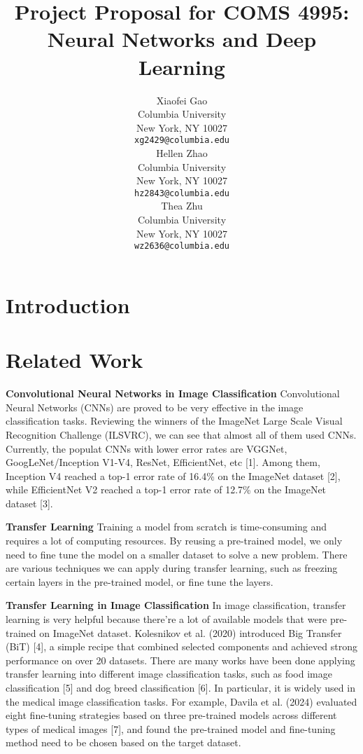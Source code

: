 \documentclass{article}
\title{Project Proposal for COMS 4995:  Neural Networks and Deep Learning}
\author{
  Xiaofei Gao \\
  Columbia University\\
  New York, NY 10027 \\
  \texttt{xg2429@columbia.edu} \\
  \And
  Hellen Zhao \\
  Columbia University\\
  New York, NY 10027 \\
  \texttt{hz2843@columbia.edu} \\
  \AND
  Thea Zhu \\
  Columbia University\\
  New York, NY 10027 \\
  \texttt{wz2636@columbia.edu} \\
}
\begin{document}
\maketitle


\begin{abstract}

\end{abstract}

\section{Introduction}

\section{Related Work}

\textbf{Convolutional Neural Networks in Image Classification} Convolutional Neural Networks (CNNs) are proved to be very effective 
in the image classification tasks. Reviewing the winners of the ImageNet Large Scale Visual Recognition Challenge (ILSVRC), we 
can see that almost all of them used CNNs. Currently, the populat CNNs with lower error rates are VGGNet, GoogLeNet/Inception V1-V4, 
ResNet, EfficientNet, etc [1]. Among them, Inception V4 reached a top-1 error rate of 16.4\% on the ImageNet dataset [2], while 
EfficientNet V2 reached a top-1 error rate of 12.7\% on the ImageNet dataset [3].

\textbf{Transfer Learning} Training a model from scratch is time-consuming and requires a lot of computing resources. By reusing 
a pre-trained model, we only need to fine tune the model on a smaller dataset to solve a new problem. There are various techniques 
we can apply during transfer learning, such as freezing certain layers in the pre-trained model, or fine tune the layers.

\textbf{Transfer Learning in Image Classification} In image classification, transfer learning is very helpful because 
there're a lot of available models that were pre-trained on ImageNet dataset. Kolesnikov et al. (2020) introduced Big Transfer (BiT) [4], 
a simple recipe that combined selected components and achieved strong performance on over 20 datasets. There are many works have been done 
applying transfer learning into different image classification tasks, such as food image classification [5] and dog breed classification [6]. 
In particular, it is widely used in the medical image classification tasks. For example, Davila et al. (2024) evaluated eight fine-tuning 
strategies based on three pre-trained models across different types of medical images [7], and found the pre-trained model and fine-tuning 
method need to be chosen based on the target dataset.
\end{document}
